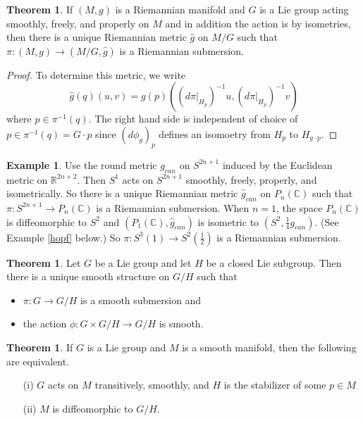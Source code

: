\documentclass{amsart}
\numberwithin{equation}{section}
\theoremstyle{definition}
\newtheorem{example}[definition]{Example}
\theoremstyle{theorem}
\newtheorem{theorem}[definition]{Theorem}
\begin{document}
\begin{theorem}
If $(M,g)$ is a Riemannian manifold and $G$ is a Lie group acting smoothly, freely, and properly on $M$ and in addition the action is by isometries, then there is a unique Riemannian metric $\hat{g}$ on $M/G$ such that $\pi : (M,g) \to (M/G, \hat{g})$ is a Riemannian submersion. 
\end{theorem}

\begin{proof}
To determine this metric, we write 
\[
\hat{g}(q)(u,v) = g(p)((d\pi |_{H_p})^{-1}u, (d\pi |_{H_p})^{-1}v )
\]
where $p\in \pi^{-1}(q)$.  The right hand side is independent of choice of $p\in \pi^{-1}(q)= G\cdot p$
since $(d\phi_g)_p$ defines an isomoetry from $H_p$ to $H_{g\cdot p}$.
\end{proof}

\begin{example}
Use the round metric $g_{can}$ on $S^{2n+1}$ induced by the Euclidean metric on $\mathbb{R}^{2n+2}$. Then $S^1$ acts on $S^{2n+1}$ smoothly, freely, properly, and isometrically. So there is a unique Riemannian metric $\hat{g}_{can}$ on $P_n(\mathbb{C})$ such that $\pi : S^{2n+1} \to P_n(\mathbb{C})$ is a Riemannian submersion. When $n = 1$, the space $P_n(\mathbb{C})$ is diffeomorphic to $S^2$ and $(P_1(\mathbb{C}), \hat{g}_{can})$ is isometric to $(S^2, \frac{1}{4}g_{can})$. (See Example
\ref{hopf} below.) So $\pi : S^3(1) \to S^2(\frac{1}{2})$ is a Riemannian submersion. 
\end{example}

\begin{theorem}
Let $G$ be a Lie group and let $H$ be a closed Lie subgroup. Then there is a unique smooth structure on $G/H$ such that 
\begin{itemize}
\item $\pi : G \to G/H$ is a smooth submersion and 
\item the action $\phi : G \times G/H \to G/H$ is smooth. 
\end{itemize}
\end{theorem}

\begin{theorem}
If $G$ is a Lie group and $M$ is a smooth manifold, then the following are equivalent. 
\begin{enumerate}
\item[(i)] $G$ acts on $M$ transitively, smoothly, and $H$ is the stabilizer of some $p \in M$
\item[(ii)] $M$ is diffeomorphic to $G/H$. 
\end{enumerate}
\end{theorem}
\end{document}

